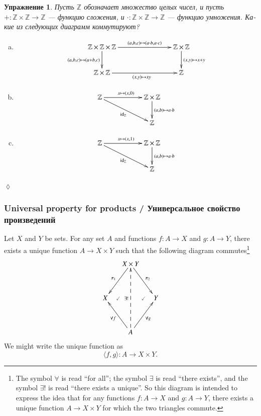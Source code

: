 \documentclass[a4paper]{book}
\def\tn{\textnormal}
\def\ZZ{{\mathbb Z}}
\def\hsp{\hspace{.3in}}
\def\to{\rightarrow}
\def\taking{\colon}
\def\la{\langle}
\def\ra{\rangle}
\newcommand{\prodmap}[2]{\la#1,#2\ra}
\def\id{\tn{id}}
\theoremstyle{myth}
\newtheorem{lemmaENG}[envENG]{\begin{english}Lemma\end{english}}
\newtheorem{excRUS}[envRUS]{Упражнение}
\newenvironment{exerciseRUS}{\begin{excRUS}}{\hspace*{\fill}$\lozenge$\end{excRUS}}
\def\sexc{\begin{enumerate}[a.)]\setlength{\itemsep}{.1cm}\setlength{\parskip}{.1cm}\item}
\def\next{\item}
\def\endsexc{\end{enumerate}}
\begin{document}
\begin{russian}
\begin{exerciseRUS}
Пусть $\ZZ$ обозначает множество целых чисел, и пусть $+\taking\ZZ\times\ZZ\to\ZZ$ — функцию сложения, и $\cdot\taking\ZZ\times\ZZ\to\ZZ$ — функцию умножения. Какие из следующих диаграмм коммутируют?
\sexc $$\xymatrix{
\ZZ\times\ZZ\times\ZZ\ar[rr]^-{(a,b,c)\mapsto(a\cdot b,a\cdot c)}\ar[d]_{(a,b,c)\mapsto(a+b,c)}&\hsp&\ZZ\times\ZZ\ar[d]^{(x,y)\mapsto x+y}\\
\ZZ\times\ZZ\ar[rr]_{(x,y)\mapsto xy}&&\ZZ}
$$
\next $$
\xymatrix{
\ZZ\ar[rr]^{x\mapsto (x,0)}\ar[drr]_{\id_\ZZ}&&\ZZ\times\ZZ\ar[d]^{(a,b)\mapsto a\cdot b}\\&&\ZZ}
$$
\next$$
\xymatrix{
\ZZ\ar[rr]^{x\mapsto (x,1)}\ar[drr]_{\id_\ZZ}&&\ZZ\times\ZZ\ar[d]^{(a,b)\mapsto a\cdot b}\\&&\ZZ}
$$
\endsexc
\end{exerciseRUS}


\subsubsection{Universal property for products / Универсальное свойство произведений}

\begin{lemmaENG}\label{lemma:up for prod}
Let $X$ and $Y$ be sets. For any set $A$ and functions $f\taking A\to X$ and $g\taking A\to Y$, there exists a unique function $A\to X\times Y$ such that the following diagram commutes\footnote{The symbol $\forall$ is read “for all”; the symbol $\exists$ is read “there exists”, and the symbol $\exists!$ is read “there exists a unique”. So this diagram is intended to express the idea that for any functions $f\taking A\to X$ and $g\taking A\to Y$, there exists a unique function $A\to X\times Y$ for which the two triangles commute.}
\begin{align}\label{dia:univ prop for products}
\xymatrix@=15pt{&X\times Y\ar[ldd]_{\pi_1}\ar[rdd]^{\pi_2}\\\\X\ar@{}[r]|{\checkmark}&&Y\ar@{}[l]|{\checkmark}\\\\&A\ar[luu]^{\forall f}\ar[ruu]_{\forall g}\ar@{-->}[uuuu]^{\exists !}}
\end{align}
We might write the unique function as $$\prodmap{f}{g}\taking A\to X\times Y.$$
\end{lemmaENG}


\end{russian}
\end{document}

